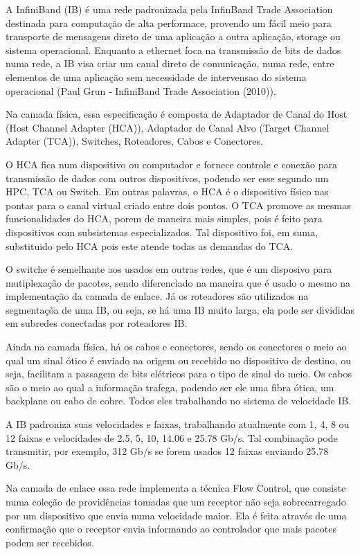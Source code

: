 \documentclass[a4paper,12pt]{article}
\begin{document}
A InfiniBand (IB) é uma rede padronizada pela InfinBand Trade Association destinada para computação de alta performace, provendo um fácil meio para transporte de mensagens direto de uma aplicação a outra aplicação, storage ou sistema operacional. Enquanto a ethernet foca na transmissão de bits de dados numa rede, a IB visa criar um canal direto de comunicação, numa rede, entre elementos de uma aplicação sem necessidade de intervensao do sistema operacional (Paul Grun - InfiniBand Trade Association (2010)).

Na camada física, essa especificação é composta de Adaptador de Canal do Host (Host Channel Adapter (HCA)), Adaptador de Canal Alvo (Target Channel Adapter (TCA)), Switches, Roteadores, Cabos e Conectores.

O HCA fica num dispositivo ou computador e fornece controle e conexão para transmissão de dados com outros dispositivos, podendo ser esse segundo um HPC, TCA ou Switch. Em outras palavras, o HCA é o dispositivo físico nas pontas para o canal virtual criado entre dois pontos. O TCA promove as mesmas funcionalidades do HCA, porem de maneira mais simples, pois é feito para dispositivos com subsistemas especializados. Tal dispositivo foi, em suma, substituido pelo HCA pois este atende todas as demandas do TCA.

O switche é semelhante aos usados em outras redes, que é um disposivo para mutiplexação de pacotes, sendo diferenciado na maneira que é usado o mesmo na implementação da camada de enlace. Já os roteadores são utilizados na segmentaçõa de uma IB, ou seja, se há uma IB muito larga, ela pode ser divididas em subredes conectadas por roteadores IB.

Ainda na camada física, há os cabos e conectores, sendo os conectores o meio ao qual um sinal ótico é enviado na origem ou recebido no dispositivo de destino, ou seja, facilitam a passagem de bits elétricos para o tipo de sinal do meio. Os cabos são o meio ao qual a informação trafega, podendo ser ele uma fibra ótica, um backplane ou cabo de cobre. Todos eles trabalhando no sistema de velocidade IB.

A IB padroniza suas velocidades e faixas, trabalhando atualmente com 1, 4, 8 ou 12 faixas e velocidades de 2.5, 5, 10, 14.06 e 25.78 Gb/s. Tal combinação pode transmitir, por exemplo, 312 Gb/s se forem usados 12 faixas enviando 25.78 Gb/s.

Na camada de enlace essa rede implementa a técnica Flow Control, que consiste numa coleção de providências tomadas que um receptor não seja sobrecarregado por um dispositivo que envia numa velocidade maior. Ela é feita através de uma confirmação que o receptor envia informando ao controlador que mais pacotes podem ser recebidos.
\end{document}
